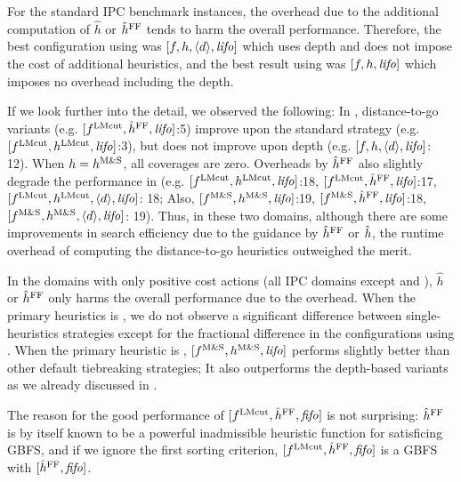 For the standard IPC benchmark instances, the overhead due to the additional computation of
$\hat{h}$ or $\hat{h}^{\text{FF}}$ tends to harm the overall performance.
Therefore, the best configuration using \lmcut was
$[f,h,{\left<d\right>},{\text{\textit{lifo}}}]$ which uses depth and does not impose the cost of
additional heuristics, and the best result using \mands
was $[f,h,{\text{\textit{lifo}}}]$ which imposes no overhead including the depth.

If we look further into the detail, we observed the following:
In , distance-to-go variants (e.g. $[f^\text{LMcut},\hat{h}^{\text{FF}},{\text{\textit{lifo}}}]$:5) improve upon the standard strategy (e.g. $[f^\text{LMcut},h^\text{LMcut},{\text{\textit{lifo}}}]$:3), but does not improve upon depth (e.g. $[f,h,{\left<d\right>},{\text{\textit{lifo}}}]$: 12). When $h=h^\text{M\&S}$, all coverages are zero. Overheads by $\hat{h}^{\text{FF}}$ also slightly degrade the performance in  (e.g. $[f^\text{LMcut},h^\text{LMcut},{\text{\textit{lifo}}}]$:18, $[f^\text{LMcut},\hat{h}^{\text{FF}},{\text{\textit{lifo}}}]$:17, $[f^\text{LMcut},h^\text{LMcut},{\left<d\right>},{\text{\textit{lifo}}}]$: 18; Also, $[f^\text{M\&S},h^\text{M\&S},{\text{\textit{lifo}}}]$:19, $[f^\text{M\&S},\hat{h}^{\text{FF}},{\text{\textit{lifo}}}]$:18, $[f^\text{M\&S},h^\text{M\&S},{\left<d\right>},{\text{\textit{lifo}}}]$: 19). Thus, in these two domains, although there are some improvements in search efficiency due to the guidance by $\hat{h}^{\text{FF}}$ or $\hat{h}$, the runtime overhead of computing the  distance-to-go heuristics outweighed the merit.
 
In the domains with only positive cost actions (all IPC domains except  and ), $\hat{h}$ or $\hat{h}^{\text{FF}}$
only harms the overall performance due to the overhead.
When the primary heuristics is \lmcut, we do not observe a significant difference between single-heuristics strategies except for the fractional difference in the configurations using \ro.
When the primary heuristic is  \mands, $[f^\text{M\&S},h^\text{M\&S},{\text{\textit{lifo}}}]$ performs slightly better than  other default tiebreaking strategies; It also outperforms the depth-based variants as we already discussed in .


The reason for the good performance of $[f^{\text{LMcut}},\hat{h}^{\text{FF}},{\text{\textit{fifo}}}]$ is not surprising:
$\hat{h}^{\text{FF}}$ is by itself known to be a powerful inadmissible heuristic  %
function for satisficing GBFS, and 
if we ignore the first sorting criterion, $[f^{\text{LMcut}},\hat{h}^{\text{FF}},{\text{\textit{fifo}}}]$ is a GBFS with $[\hat{h}^{\text{FF}},{\text{\textit{fifo}}}]$.

